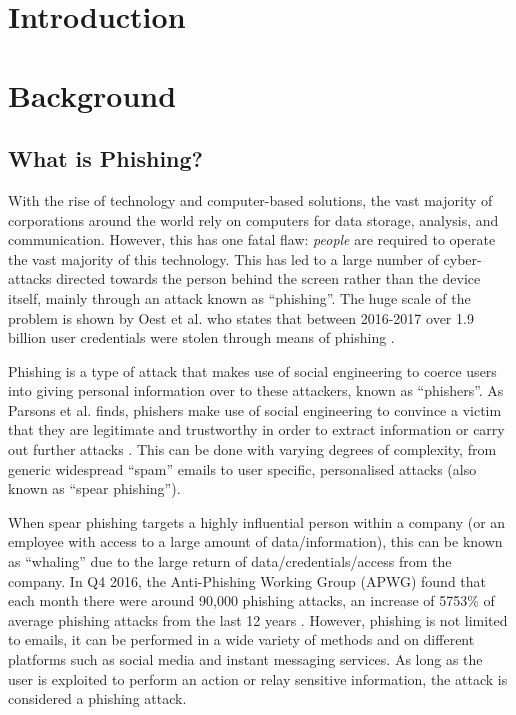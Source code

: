 \documentclass{l4proj}
\begin{document}
\chapter{Introduction}




\chapter{Background}

\section{What is Phishing?}
With the rise of technology and computer-based solutions, the vast majority of corporations around the world rely on computers for data storage, analysis, and communication. However, this has one fatal flaw: \textit{people} are required to operate the vast majority of this technology. This has led to a large number of cyber-attacks directed towards the person behind the screen rather than the device itself, mainly through an attack known as “phishing”. The huge scale of the problem is shown by Oest et al. who states that between 2016-2017 over 1.9 billion user credentials were stolen through means of phishing \citep{oest2018inside}.

Phishing is a type of attack that makes use of social engineering to coerce users into giving personal information over to these attackers, known as “phishers”. As Parsons et al. finds, phishers make use of social engineering to convince a victim that they are legitimate and trustworthy in order to extract information or carry out further attacks \citep{parsons2019predicting}. This can be done with varying degrees of complexity, from generic widespread “spam” emails to user specific, personalised attacks (also known as “spear phishing”). 

When spear phishing targets a highly influential person within a company (or an employee with access to a large amount of data/information), this can be known as “whaling” due to the large return of data/credentials/access from the company. In Q4 2016, the Anti-Phishing Working Group (APWG) found that each month there were around 90,000 phishing attacks, an increase of 5753\% of average phishing attacks from the last 12 years \citep{apwg2017phishing}. However, phishing is not limited to emails, it can be performed in a wide variety of methods and on different platforms such as social media and instant messaging services. As long as the user is exploited to perform an action or relay sensitive information, the attack is considered a phishing attack.
\end{document}
